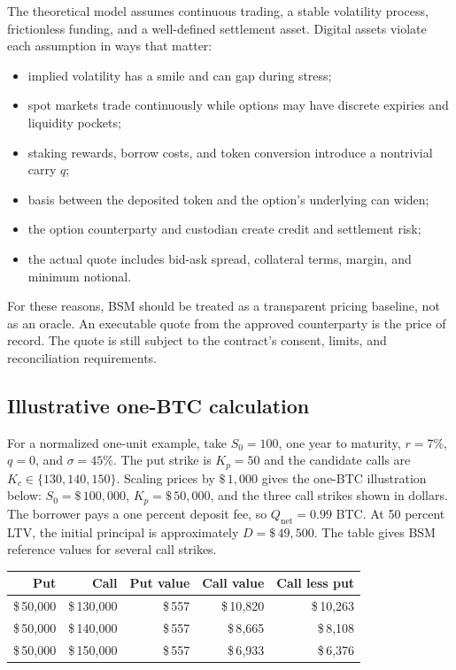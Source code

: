 \documentclass[11pt,oneside]{article}
\newcommand{\dollar}[1]{\$\,#1}
\begin{document}
The theoretical model assumes continuous trading, a stable volatility process, frictionless funding, and a well-defined settlement asset. Digital assets violate each assumption in ways that matter:

\begin{itemize}
\item implied volatility has a smile and can gap during stress;
\item spot markets trade continuously while options may have discrete expiries and liquidity pockets;
\item staking rewards, borrow costs, and token conversion introduce a nontrivial carry $q$;
\item basis between the deposited token and the option's underlying can widen;
\item the option counterparty and custodian create credit and settlement risk;
\item the actual quote includes bid-ask spread, collateral terms, margin, and minimum notional.
\end{itemize}

For these reasons, BSM should be treated as a transparent pricing baseline, not as an oracle. An executable quote from the approved counterparty is the price of record. The quote is still subject to the contract's consent, limits, and reconciliation requirements.

\subsection{Illustrative one-BTC calculation}

For a normalized one-unit example, take $S_0=100$, one year to maturity,
$r=7\%$, $q=0$, and $\sigma=45\%$. The put strike is $K_p=50$ and the
candidate calls are $K_c\in\{130,140,150\}$. Scaling prices by $\dollar{1{,}000}$
gives the one-BTC illustration below: $S_0=\dollar{100{,}000}$,
$K_p=\dollar{50{,}000}$, and the three call strikes shown in dollars. The
borrower pays a one percent deposit fee, so $Q_{\mathrm{net}}=0.99$ BTC. At 50
percent LTV, the initial principal is approximately $D=\dollar{49{,}500}$.
The table gives BSM reference values for several call strikes.

\begin{center}
\begin{tabular}{@{}rrrrr@{}}
\toprule
\textbf{Put} & \textbf{Call} & \textbf{Put value} & \textbf{Call value} & \textbf{Call less put} \\
\midrule
\dollar{50{,}000} & \dollar{130{,}000} & \dollar{557} & \dollar{10{,}820} & \dollar{10{,}263} \\
\dollar{50{,}000} & \dollar{140{,}000} & \dollar{557} & \dollar{8{,}665} & \dollar{8{,}108} \\
\dollar{50{,}000} & \dollar{150{,}000} & \dollar{557} & \dollar{6{,}933} & \dollar{6{,}376} \\
\bottomrule
\end{tabular}
\end{center}
\end{document}
